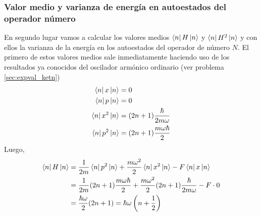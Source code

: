 \documentclass[10pt, a4paper]{article}
\numberwithin{equation}{subsection}
\begin{document}
\subsubsection{Valor medio y varianza de energía en autoestados del operador
  número}
En segundo lugar vamos a calcular los valores medios $\bra{n}H\ket{n}$ y
$\bra{n}H^2\ket{n}$ y con ellos la varianza de la energía en los autoestados
del operador de número $N$. El primero de estos valores medios sale
inmediatamente haciendo uso de los resultados ya conocidos del oscilador
armónico ordinario (ver problema \ref{sec:expval_ketn})
\begin{align}
  \bra{n}x\ket{n} &= 0 \\
  \bra{n}p\ket{n} &= 0 \\
  \bra{n}x^2\ket{n} &= (2n + 1)\frac{\hbar}{2m\omega} \\
  \bra{n}p^2\ket{n} &= (2n + 1)\frac{m\omega\hbar}{2}
\end{align}
Luego,
\begin{align}
  \bra{n}H\ket{n} &= \frac{1}{2m}\bra{n}p^2\ket{n} +
    \frac{m\omega^2}{2}\bra{n}x^2\ket{n} - F\bra{n}x\ket{n} \\
  &= \frac{1}{2m}(2n + 1)\frac{m\omega\hbar}{2} +
    \frac{m\omega^2}{2}(2n + 1)\frac{\hbar}{2m\omega} - F\cdot 0 \\
  &= \frac{\hbar\omega}{2}(2n + 1) = \hbar\omega\left(n + \frac{1}{2}\right)
\end{align}
\end{document}
